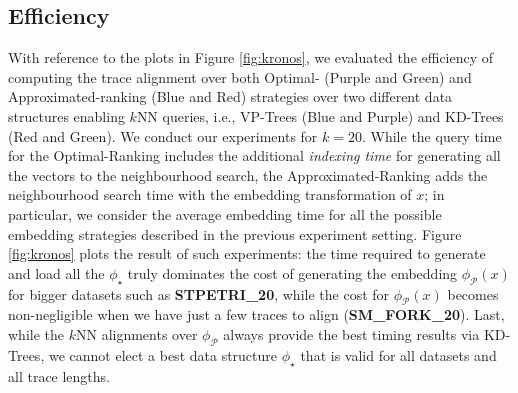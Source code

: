 \subsection{Efficiency}\label{subsec:efficio}
With reference to the plots in Figure \ref{fig:kronos}, 
we evaluated the efficiency of computing the trace alignment over both Optimal- ({\color{ggplotPurple}Purple} and {\color{ggplotGreen}Green}) and Approximated-ranking ({\color{ggplotBlue}Blue} and {\color{ggplotRed}Red}) strategies over two different data structures enabling $k$NN queries, i.e., VP-Trees ({\color{ggplotBlue}Blue} and {\color{ggplotPurple}Purple}) and KD-Trees ({\color{ggplotRed}Red} and {\color{ggplotGreen}Green}). We conduct our experiments for $k=20$. While the query time for the Optimal-Ranking  includes the additional \textit{indexing time} for generating all the vectors to the neighbourhood search, the Approximated-Ranking  adds the neighbourhood search time with the embedding transformation of $x$; in particular, we consider the average embedding time for all the possible embedding strategies described in the previous experiment setting. Figure \ref{fig:kronos} plots the result of such experiments: the time required to generate and load all the $\phi_\star$ truly dominates the cost of generating the embedding $\phi_{\mathcal{P}}(x)$ for bigger datasets such as \textbf{STPETRI\_20}, while the cost for $\phi_{\mathcal{P}}(x)$ becomes non-negligible when we have just a few traces to align (\textbf{SM\_FORK\_20}). Last, while the $k$NN alignments over $\phi_{\mathcal{P}}$ always provide the best timing results via KD-Trees, we cannot elect a best data structure $\phi_\star$ that is valid for all datasets and all trace lengths. 